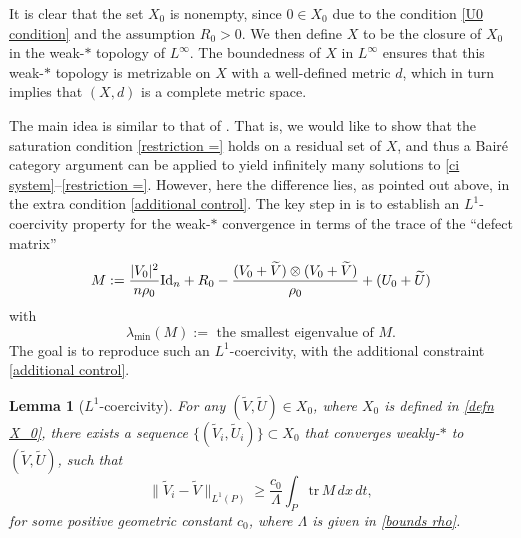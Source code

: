 \documentclass[12pt,reqno]{amsart}
\newtheorem{Lemma}{Lemma}[section]
\theoremstyle{definition}
\theoremstyle{remark}
\numberwithin{equation}{section}
\newcommand{\id}{\mathrm{Id}}
\newcommand{\trace}{\mathrm{tr}}
\begin{document}
It is clear that the set $ X_0 $ is nonempty, since $ 0 \in X_0 $ due to the condition \eqref{U0 condition} and the assumption $ R_0 > 0 $. We then define $ X $ to be the closure of $ X_0 $ in the weak-$\ast$ topology of $ L^\infty $. The boundedness of $ X $ in $ L^\infty $ ensures that this weak-$\ast$ topology is metrizable on $ X $ with a well-defined metric $d$, which in turn implies that $ (X, d) $ is a complete metric space.

The main idea is similar to that of \cite{CVY}. That is, we would like to show that the saturation condition \eqref{restriction =} holds on a residual set of $X$, and thus a Bair\'e category argument can be applied to yield infinitely many solutions to \eqref{ci system}--\eqref{restriction =}. However, here the difference lies, as pointed out above, in the extra condition \eqref{additional control}. The key step in \cite{CVY} is to establish an $L^1$-coercivity property for the weak-$\ast$ convergence in terms of the trace of the ``defect matrix''
$$
M := {|V_0|^2 \over n\rho_0} \id_n + R_0-\frac{(V_0 + \widetilde{V}) \otimes (V_0 + \widetilde{V})} { \rho_0} + (U_0 + \widetilde U)
$$
with 
\[
\lambda_{\min}(M) := \text{ the smallest eigenvalue of } M.
\]
The goal is to reproduce such an $L^1$-coercivity, with the additional constraint \eqref{additional control}. 

\begin{Lemma}[$L^1$-coercivity]
\label{L1-coercivity}
For any $(\widetilde{V}, \widetilde{U}) \in X_0$, where $X_0$ is defined in \eqref{defn X_0}, there exists a sequence $\{(\widetilde{V}_i, \widetilde{U}_i)\} \subset X_0$ that converges weakly-$*$ to $(\widetilde{V}, \widetilde{U})$, such that
$$
\|\widetilde{V}_i - \widetilde{V}\|_{L^1(P)} \geq \frac{c_0}{\Lambda} \int_{P} \trace \, M \, dx \, dt,
$$
for some positive geometric constant $c_0$, where $\Lambda$ is given in \eqref{bounds rho}.
\end{Lemma}
\end{document}
